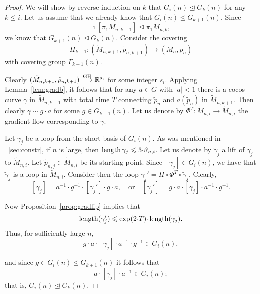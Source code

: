 \documentclass{amsart}
\begin{document}
\begin{proof}
We will show by reverse induction on $k$
that $G_i(n)\unlhd G_{k}(n)$ for any $k\le i$.
Let us assume that we already know that $G_i(n)\unlhd G_{k+1}(n)$.
Since 
$$\imath[\pi_1M_{n,k+1}]\unlhd\pi_1M_{n,k},$$
we know that $G_{k+1}(n)\unlhd G_{k}(n)$.
Consider the covering
$$\Pi_{k+1}\colon (\tilde M_{n,k+1},\tilde p_{n,k+1})\to (M_n,p_n)$$
with covering group $\Gamma_{k+1}(n)$.



Clearly $(\tilde M_{n,k+1},\tilde p_{n,k+1})\GHto \mathbb{R}^{s_i}$
for some integer $s_i$.
Applying Lemma~\ref{lem:gradb}, it follows
that for any $a\in G$ with $|a|<1$ there is
a cocos-curve $\gamma$ in $\tilde M_{n,k+1}$
with total time $T$ connecting
$\tilde p_n$ and $a(\tilde p_n)$ in $\tilde M_{n,k+1}$.
Then clearly $\gamma\sim g{\cdot} a$ for some $g\in G_{k+1}(n)$.
Let us denote by $\Phi^T\colon  \tilde M_{n,i}\to \tilde M_{n,i}$ the gradient flow
corresponding  to $\gamma$.

Let $\gamma_j$ be a loop
from the short basis of $G_i(n)$.
As was mentioned in ~\ref{sec:constr},
if $n$ is large, then $\operatorname{\rm length}\gamma_j\leqslant 3{\cdot} \vartheta_{n,i}$.
Let us denote by  $\tilde\gamma_j$ a lift of $\gamma_j$ to $\tilde M_{n,i}$.
Let $\tilde p_{n,j}\in \tilde M_{n,i}$ be its starting point.
Since $[\gamma_j]\in G_i(n)$, we have that
$\tilde\gamma_j$ is a loop in $\tilde M_{n,i}$.
Consider then the loop
 $\gamma_j'=\Pi\circ\Phi^T\circ
\tilde\gamma_j$.
Clearly,
$$[\gamma_j]=a^{-1}{\cdot} g^{-1}{\cdot} [\gamma_j']{\cdot} g{\cdot} a ,
\quad\text{or}\quad[\gamma_j']=g{\cdot} a{\cdot} [\gamma_j]{\cdot} a^{-1}{\cdot} g^{-1}.$$


Now Proposition~\ref{prop:gradlip} implies that
$$\operatorname{\rm length}(\gamma_j')\leqslant \exp(2{\cdot} T){\cdot} \operatorname{\rm length}(\gamma_j).$$
Thus, for sufficiently large $n$,
$$ g{\cdot} a{\cdot} [\gamma_j]{\cdot} a^{-1}{\cdot} g^{-1} \in G_i(n),$$

and since $g\in G_i(n)\unlhd  G_{k+1}(n)$ it follows that
$$ a{\cdot} [\gamma_j]{\cdot} a^{-1} \in G_i(n);$$
that is, $G_i(n)\unlhd  G_{k}(n)$.

\end{proof}
\end{document}

